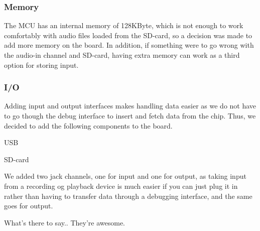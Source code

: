 \subsubsection{Memory} The MCU has an internal memory of 128KByte, which is not
enough to work comfortably with audio files loaded from the SD-card, so a
decision was made to add more memory on the board. In addition, if something
were to go wrong with the audio-in channel and SD-card, having extra memory can
work as a third option for storing input.

\subsubsection{I/O} Adding input and output interfaces makes handling data easier
as we do not have to go though the debug interface to insert and fetch data from
the chip. Thus, we decided to add the following components to the
board.

 USB 

 SD-card 

 We added two jack channels, one for input and one for
output, as taking input from a recording og playback device is much easier if
you can just plug it in rather than having to transfer data through a debugging
interface, and the same goes for output.

 What's there to say.. They're
awesome.
